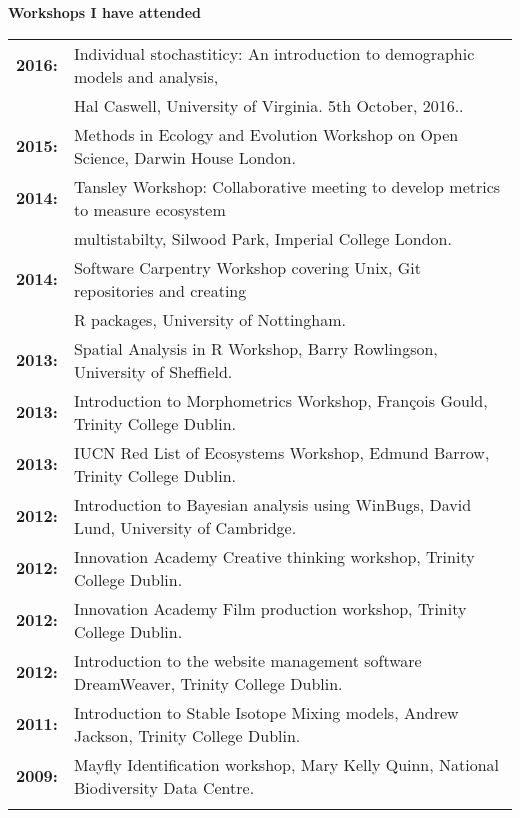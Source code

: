 \documentclass[10pt,a4paper]{article}
\begin{document}
\raggedright\textbf{Workshops I have attended}\\
\begin{tabular}{ll}
\textbf{2016:} & Individual stochastiticy: An introduction to demographic models and analysis,\\ 
&Hal Caswell, University of Virginia. 5th October, 2016..\\
\textbf{2015:} & Methods in Ecology and Evolution Workshop on Open Science, Darwin House London.\\
\textbf{2014:} & Tansley Workshop: Collaborative meeting to develop metrics to measure ecosystem\\
&multistabilty, Silwood Park, Imperial College London.\\
\textbf{2014:} & Software Carpentry Workshop covering Unix, Git repositories and creating\\
&R packages, University of Nottingham.\\
\textbf{2013:} & Spatial Analysis in R Workshop, Barry Rowlingson, University of Sheffield.\\
\textbf{2013:} & Introduction to Morphometrics Workshop, François Gould, Trinity College Dublin.\\
\textbf{2013:} & IUCN Red List of Ecosystems Workshop, Edmund Barrow, Trinity College Dublin.\\
\textbf{2012:} & Introduction to Bayesian analysis using WinBugs, David Lund, University of Cambridge.\\
\textbf{2012:} & Innovation Academy Creative thinking workshop, Trinity College Dublin.\\
\textbf{2012:} & Innovation Academy Film production workshop, Trinity College Dublin.\\
\textbf{2012:} & Introduction to the website management software DreamWeaver, Trinity College Dublin.\\
\textbf{2011:} & Introduction to Stable Isotope Mixing models, Andrew Jackson, Trinity College Dublin.\\
\textbf{2009:} & Mayfly Identification workshop, Mary Kelly Quinn, National Biodiversity Data Centre.\\
&\\
\end{tabular}
\end{document}
